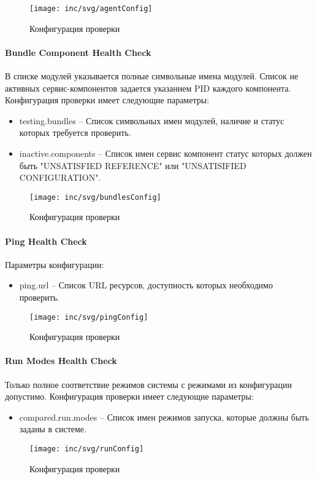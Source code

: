 \begin{figure}[H]
  \centering
  \texttt{[image: inc/svg/agentConfig]}
  \caption{Конфигурация проверки}
  \label{fig:agentConfig}
\end{figure}


\paragraph{Bundle Component Health Check}
В списке модулей указывается полные символьные имена модулей. Список не активных сервис-компонентов задается указанием PID каждого компонента.
Конфигурация проверки имеет следующие параметры:
\begin{itemize}
\item testing.bundles – Список символьных имен модулей, наличие и статус которых требуется проверить.
\item inactive.components – Список имен сервис компонент статус которых должен быть "UNSATISFIED REFERENCE" или "UNSATISIFIED CONFIGURATION".
\end{itemize}

\begin{figure}[H]
  \centering
  \texttt{[image: inc/svg/bundlesConfig]}
  \caption{Конфигурация проверки}
  \label{fig:bundlesConfig}
\end{figure}

\paragraph{Ping Health Check}
Параметры конфигурации:
\begin{itemize}
\item ping.url – Список URL ресурсов, доступность которых необходимо проверить.
\end{itemize}

\begin{figure}[H]
  \centering
  \texttt{[image: inc/svg/pingConfig]}
  \caption{Конфигурация проверки}
  \label{fig:pingConfig}
\end{figure}

\paragraph{Run Modes Health Check}
Только полное соответствие режимов системы с режимами из конфигурации допустимо. Конфигурация проверки имеет следующие параметры:
\begin{itemize}
\item compared.run.modes – Список имен режимов запуска, которые должны быть заданы в системе.
\end{itemize}

\begin{figure}[H]
  \centering
  \texttt{[image: inc/svg/runConfig]}
  \caption{Конфигурация проверки}
  \label{fig:runConfig}
\end{figure}



